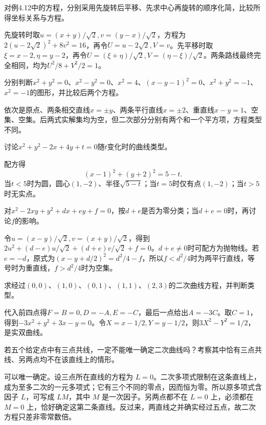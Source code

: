 对例4.12中的方程，分别采用先旋转后平移、先求中心再旋转的顺序化简，比较所得坐标关系与方程。
\par
\solutionanswer
先旋转时取\(u=(x+y)/\sqrt2,v=(y-x)/\sqrt2\)，方程为\(2(u-2\sqrt2)^2+8v^2=16\)，再令\(U=u-2\sqrt2,V=v\)。先平移时取\(\xi=x-2,\eta=y-2\)，再令\(U=(\xi+\eta)/\sqrt2,V=(\eta-\xi)/\sqrt2\)。两条路线最终完全相同，均为\(U^2/8+V^2/2=1\)。


分别判断\(x^2+y^2=0\)、\(x^2-y^2=0\)、\(x^2=4\)、\((x-y-1)^2=0\)、\(x^2+y^2=-1\)、\(x^2=-1\)的图形，并比较后两个方程。
\par
\solutionanswer
依次是原点、两条相交直线\(x=\pm y\)、两条平行直线\(x=\pm2\)、重直线\(x-y=1\)、空集、空集。后两式实解集均为空，但二次部分分别有两个和一个平方项，方程类型不同。


讨论\(x^2+y^2-2x+4y+t=0\)随\(t\)变化时的曲线类型。
\par
\solutionanswer
配方得
\[(x-1)^2+(y+2)^2=5-t.\]
当\(t<5\)时为圆，圆心\((1,-2)\)、半径\(\sqrt{5-t}\)；当\(t=5\)时仅有点\((1,-2)\)；当\(t>5\)时无实点。


对\(x^2-2xy+y^2+dx+ey+f=0\)，按\(d+e\)是否为零分类；当\(d+e=0\)时，再讨论\(f\)的影响。
\par
\solutionanswer
令\(u=(x-y)/\sqrt2,v=(x+y)/\sqrt2\)，得到\(2u^2+(d-e)u/\sqrt2+(d+e)v/\sqrt2+f=0\)。\(d+e\ne0\)时可配方为抛物线。若\(e=-d\)，原式为\((x-y+d/2)^2=d^2/4-f\)，所以\(f<d^2/4\)时为两平行直线，等号时为重直线，\(f>d^2/4\)时为空集。


求经过\((0,0)\)、\((1,0)\)、\((0,1)\)、\((1,1)\)、\((2,3)\)的二次曲线方程，并判断类型。
\par
\solutionanswer
代入前四点得\(F=B=0,D=-A,E=-C\)，最后一点给出\(A=-3C\)。取\(C=1\)，得到\(-3x^2+y^2+3x-y=0\)。令\(X=x-1/2,Y=y-1/2\)，则\(3X^2-Y^2=1/2\)，是实双曲线。


若五个给定点中有三点共线，一定不能唯一确定二次曲线吗？考察其中恰有三点共线、另两点均不在该直线上的情形。
\par
\solutionanswer
可以唯一确定。设三点所在直线的方程为 \(L=0\)。二次多项式限制在这条直线上，成为至多二次的一元多项式；它有三个不同的零点，因而恒为零。所以原多项式含因子 \(L\)，可写成 \(LM\)，其中 \(M\) 是一次因子。另两点都不在 \(L=0\) 上，必须都在 \(M=0\) 上，恰好确定这第二条直线。反过来，两直线之并确实经过五点，故二次方程只差非零常数倍。



